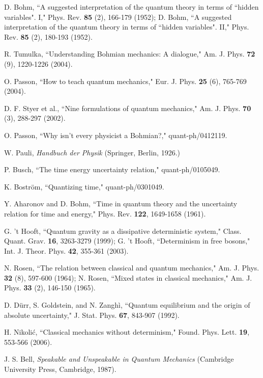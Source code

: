 \documentclass[12pt]{article}
\begin{document}
\begin{thebibliography}{99}


D. Bohm,
``A suggested interpretation of the quantum theory in terms of
``hidden variables". I,"
Phys. Rev. {\bf 85} (2), 166-179 (1952);
D. Bohm,   
``A suggested interpretation of the quantum theory in terms of
``hidden variables". II,"
Phys. Rev. {\bf 85} (2), 180-193 (1952).

R. Tumulka,
``Understanding Bohmian mechanics: A dialogue,"
Am. J. Phys. {\bf 72} (9), 1220-1226 (2004).
 
O. Passon, 
``How to teach quantum mechanics,"
Eur. J. Phys. {\bf 25} (6), 765-769 (2004).

D. F. Styer et al., 
``Nine formulations of quantum mechanics,"
Am. J. Phys. {\bf 70} (3), 288-297 (2002).

O. Passon,
``Why isn't every physicist a Bohmian?,"
quant-ph/0412119.

W. Pauli, {\it Handbuch der Physik}
(Springer, Berlin, 1926.)

P. Busch,
``The time energy uncertainty relation,"
quant-ph/0105049.

K. Bostr\"om,
``Quantizing time,"
quant-ph/0301049.

Y. Aharonov and D. Bohm,
``Time in quantum theory and the uncertainty relation
for time and energy,"
Phys. Rev. {\bf 122}, 1649-1658 (1961).

G. 't Hooft,
``Quantum gravity as a dissipative deterministic system,"
Class. Quant. Grav. {\bf 16}, 3263-3279 (1999);
G. 't Hooft,
``Determinism in free bosons,"
Int. J. Theor. Phys. {\bf 42}, 355-361 (2003).

N. Rosen,
``The relation between classical and quantum mechanics,"
Am. J. Phys. {\bf 32} (8), 597-600 (1964);
N. Rosen,
``Mixed states in classical mechanics,"
Am. J. Phys. {\bf 33} (2), 146-150 (1965).

D. D\"urr, S. Goldstein, and N. Zangh\`i,
``Quantum equilibrium and the origin of absolute uncertainty,"
J. Stat. Phys. {\bf 67}, 843-907 (1992).

H. Nikoli\'c,
``Classical mechanics without determinism,"
Found. Phys. Lett. {\bf 19}, 553-566 (2006).

J. S. Bell, {\it Speakable and Unspeakable in Quantum Mechanics}
(Cambridge University Press, Cambridge, 1987).


\end{thebibliography}
\end{document}
